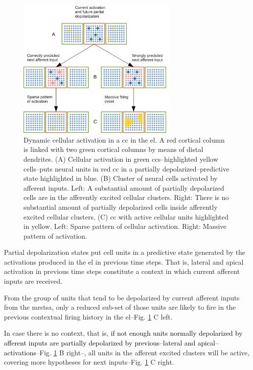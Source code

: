 \documentclass[10pt,letterpaper]{article}
\newcommand{\reviewertwo}[1]{\textcolor{black}{#1}}
\begin{document}
\begin{figure}[h!]
    \centering
    \includegraphics[width=0.7\textwidth]{Activation.png}
    \caption{Dynamic cellular activation in a \gls{cc} in the \gls{el}.
    A red cortical column is linked with two green cortical columns by means of distal dendrites.
    (A) Cellular activation in green \glspl{cc}--highlighted yellow cells--puts neural units
    in red \gls{cc} in a partially depolarized--predictive state highlighted in blue.
    (B) Cluster of neural cells activated by afferent inputs.
    Left: A substantial amount of partially depolarized cells are in the afferently excited cellular clusters.
    Right: There is no substantial amount of partially depolarized cells inside afferently excited cellular clusters.
    (C) \gls{cc} with active cellular units highlighted in yellow.
    Left: Sparse pattern of cellular activation.
    Right: Massive pattern of activation.}
    \label{fig:Activation}
\end{figure}

\pagebreak

Partial depolarization states put cell units in a predictive state generated by
the activations produced in the \gls{el} in previous time steps.
That is, lateral and apical activation in previous time steps constitute a context in which
current afferent inputs are received.

From the group of units that tend to be depolarized by current afferent inputs from the \gls{mrstsa},
only a reduced sub-set of those units are likely to fire in the previous contextual firing history
in the \gls{el}--Fig. \ref{fig:Activation} C left.

In case there is no context, that is, \reviewertwo{if not enough units normally depolarized by afferent inputs
are partially depolarized by previous--lateral and apical--activations}--Fig. \ref{fig:Activation} B right--,
all units in the afferent excited clusters will be active, covering more hypotheses for next inputs--Fig. \ref{fig:Activation} C right.
\end{document}
